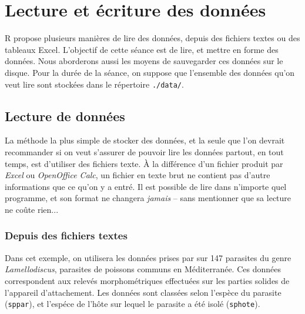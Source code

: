 \chapter{Lecture et écriture des données}

R propose plusieurs manières de lire des données, depuis des fichiers textes ou des tableaux Excel.
L'objectif de cette séance est de lire, et mettre en forme des données.
Nous aborderons aussi les moyens de sauvegarder ces données sur le disque.
Pour la durée de la séance, on suppose que l'ensemble des données qu'on veut lire sont stockées dans le répertoire \texttt{./data/}.

\section{Lecture de données}

La méthode la plus simple de stocker des données, et la seule que l'on devrait recommander si on veut s'assurer de pouvoir lire les données partout, en tout temps, est d'utiliser des fichiers texte.
À la différence d'un fichier produit par \emph{Excel} ou \emph{OpenOffice Calc}, un fichier en texte brut ne contient pas d'autre informations que ce qu'on y a entré.
Il est possible de lire dans n'importe quel programme, et son format ne changera \emph{jamais} -- sans mentionner que sa lecture ne coûte rien... 

\subsection{Depuis des fichiers textes}

Dans cet exemple, on utilisera les données prises par \textcite{PoisotBJLS2010} sur 147 parasites du genre \emph{Lamellodiscus}, parasites de poissons communs en Méditerranée.
Ces données correspondent aux relevés morphométriques effectuées sur les parties solides de l'appareil d'attachement. Les données sont classées selon l'espèce du parasite (\texttt{sppar}),
 et l'espéce de l'hôte sur lequel le parasite a été isolé (\texttt{sphote}).

